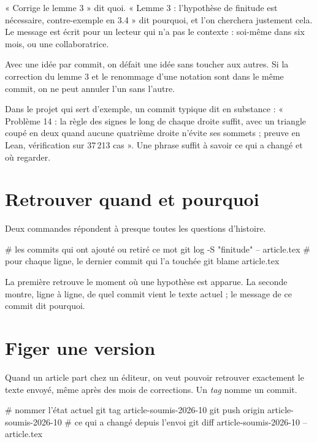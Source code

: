 « Corrige le lemme 3 » dit quoi. « Lemme 3 : l'hypothèse de finitude est nécessaire,
contre-exemple en 3.4 » dit pourquoi, et l'on cherchera justement cela. Le message est écrit
pour un lecteur qui n'a pas le contexte : soi-même dans six mois, ou une collaboratrice.

Avec une idée par commit, on défait une idée sans toucher aux autres. Si la correction du
lemme 3 et le renommage d'une notation sont dans le même commit, on ne peut annuler l'un
sans l'autre.

\begin{exemple}
Dans le projet qui sert d'exemple, un commit typique dit en substance : « Problème 14 : la règle
des signes le long de chaque droite suffit, avec un triangle coupé en deux quand aucune
quatrième droite n'évite ses sommets ; preuve en Lean, vérification sur 37\,213 cas ». Une phrase
suffit à savoir ce qui a changé et où regarder.
\end{exemple}

\section{Retrouver quand et pourquoi}

Deux commandes répondent à presque toutes les questions d'histoire.

\begin{terminal}
# les commits qui ont ajouté ou retiré ce mot
git log -S "finitude" -- article.tex
# pour chaque ligne, le dernier commit qui l'a touchée
git blame article.tex
\end{terminal}

La première retrouve le moment où une hypothèse est apparue. La seconde montre, ligne à
ligne, de quel commit vient le texte actuel ; le message de ce commit dit pourquoi.

\section{Figer une version}

Quand un article part chez un éditeur, on veut pouvoir retrouver exactement le texte
envoyé, même après des mois de corrections. Un \emph{tag} nomme un commit.

\begin{terminal}
# nommer l'état actuel
git tag article-soumis-2026-10
git push origin article-soumis-2026-10
# ce qui a changé depuis l'envoi
git diff article-soumis-2026-10 -- article.tex
\end{terminal}

